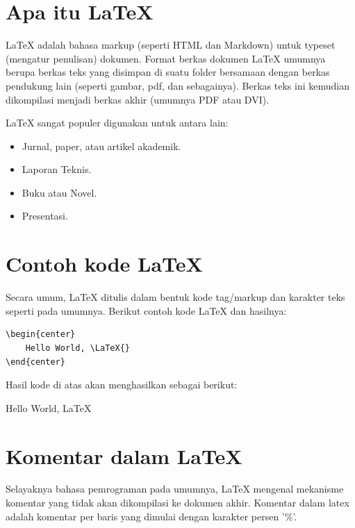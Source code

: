 \documentclass{book} %
\begin{document}
    \section{Apa itu \LaTeX{}}

    \LaTeX{} adalah bahasa markup (seperti HTML dan Markdown) untuk typeset (mengatur penulisan) dokumen.
    Format berkas dokumen \LaTeX{} umumnya berupa berkas teks yang disimpan di suatu folder
    bersamaan dengan berkas pendukung lain (seperti gambar, pdf, dan sebagainya).
    Berkas teks ini kemudian dikompilasi menjadi berkas akhir (umumnya PDF atau DVI).

    \LaTeX{} sangat populer digunakan untuk antara lain:
    \begin{itemize}
        \item Jurnal, paper, atau artikel akademik.
        \item Laporan Teknis.
        \item Buku atau Novel.
        \item Presentasi.
    \end{itemize}

    \section{Contoh kode \LaTeX{}}

    Secara umum, \LaTeX{} ditulis dalam bentuk kode tag/markup dan karakter teks seperti pada umumnya.
    Berikut contoh kode \LaTeX{} dan hasilnya:

    \begin{verbatim}
\begin{center}
    Hello World, \LaTeX{}
\end{center}
    \end{verbatim}

    Hasil kode di atas akan menghasilkan sebagai berikut:
    \begin{center}
        Hello World, \LaTeX{}
    \end{center}

    \section{Komentar dalam LaTeX}

    Selayaknya bahasa pemrograman pada umumnya, LaTeX mengenal mekanisme komentar yang tidak akan dikompilasi ke dokumen akhir.
    Komentar dalam latex adalah komentar per baris yang dimulai dengan karakter persen '\%'.
\end{document}
